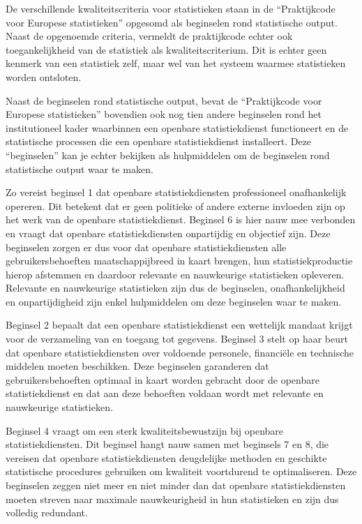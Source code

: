 \documentclass[\mainfiledir/00_handleiding_statistiekproductie.tex]{subfiles}
\begin{document}
\begin{info}
	De verschillende kwaliteitscriteria voor statistieken staan in de ``Praktijkcode voor Europese statistieken'' opgesomd als beginselen rond statistische output. Naast de opgenoemde criteria, vermeldt de praktijkcode echter ook toegankelijkheid van de statistiek als kwaliteitscriterium. Dit is echter geen kenmerk van een statistiek zelf, maar wel van het systeem waarmee statistieken worden ontsloten.
		
	Naast de beginselen rond statistische output, bevat de ``Praktijkcode voor Europese statistieken'' bovendien ook nog tien andere beginselen rond het institutioneel kader waarbinnen een openbare statistiekdienst functioneert en de statistische processen die een openbare statistiekdienst installeert. Deze ``beginselen'' kan je echter bekijken als hulpmiddelen om de beginselen rond statistische output waar te maken. 
	
	Zo vereist beginsel 1 dat openbare statistiekdiensten professioneel onafhankelijk opereren. Dit betekent dat er geen politieke of andere externe invloeden zijn op het werk van de openbare statistiekdienst. Beginsel 6 is hier nauw mee verbonden en vraagt dat openbare statistiekdiensten onpartijdig en objectief zijn. Deze beginselen zorgen er dus voor dat openbare statistiekdiensten alle gebruikersbehoeften maatschappijbreed in kaart brengen, hun statistiekproductie hierop afstemmen en daardoor relevante en nauwkeurige statistieken opleveren. Relevante en nauwkeurige statistieken zijn dus de beginselen, onafhankelijkheid en onpartijdigheid zijn enkel hulpmiddelen om deze beginselen waar te maken. 
	
	Beginsel 2 bepaalt dat een openbare statistiekdienst een wettelijk mandaat krijgt voor de verzameling van en toegang tot gegevens. Beginsel 3 stelt op haar beurt dat openbare statistiekdiensten over voldoende personele, financiële en technische middelen moeten beschikken. Deze beginselen garanderen dat gebruikersbehoeften optimaal in kaart worden gebracht door de openbare statistiekdienst en dat aan deze behoeften voldaan wordt met relevante en nauwkeurige statistieken.
	
	Beginsel 4 vraagt om een sterk kwaliteitsbewustzijn bij openbare statistiekdiensten. Dit beginsel hangt nauw samen met beginsels 7 en 8, die vereisen dat openbare statistiekdiensten deugdelijke methoden en geschikte statistische procedures gebruiken om kwaliteit voortdurend te optimaliseren. Deze beginselen zeggen niet meer en niet minder dan dat openbare statistiekdiensten moeten streven naar maximale nauwkeurigheid in hun statistieken en zijn dus volledig redundant.  
\end{info}	
\end{document}

